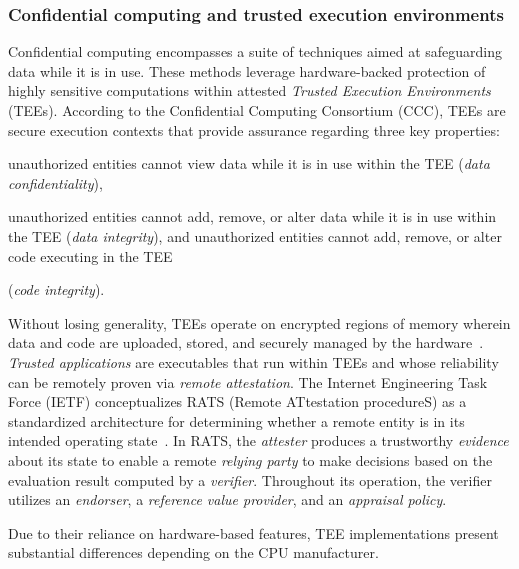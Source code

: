 \begin{newj}
\subsubsection{Confidential computing and trusted execution environments}
\label{sec:background:tee}
Confidential computing encompasses a suite of techniques aimed at safeguarding data while it is in use. These methods leverage hardware-backed protection of highly sensitive computations within attested \emph{Trusted Execution Environments} (TEEs). According to the Confidential Computing Consortium (CCC), TEEs are secure execution contexts that provide assurance regarding three key properties:
\begin{inparaenum}[]
	\item unauthorized entities cannot view data while it is in use within the TEE (\textit{data confidentiality}), \item unauthorized entities cannot add, remove, or alter data while it is in use within the TEE (\textit{data integrity}), and unauthorized entities cannot add, remove, or alter code executing in the TEE \item (\textit{code integrity}).
\end{inparaenum}
Without losing generality, TEEs operate on encrypted regions of memory wherein data and code are uploaded, stored, and securely managed by the hardware~\citep{DBLP:conf/trustcom/SabtAB15}.
\emph{Trusted applications} are executables that run within TEEs and whose reliability can be remotely proven via \emph{remote attestation}. The Internet Engineering Task Force (IETF) conceptualizes RATS (Remote ATtestation procedureS) as a standardized architecture for determining whether a remote entity is in its intended operating state~\cite{rfc9334}. In RATS, the \emph{attester} produces a trustworthy \emph{evidence} about its state to enable a remote \emph{relying party} to make decisions based on the evaluation result computed by a \emph{verifier}. Throughout its operation, the verifier utilizes an \emph{endorser}, a \emph{reference value provider}, and an \emph{appraisal policy}.

Due to their reliance on hardware-based features, TEE implementations present substantial differences depending on the CPU manufacturer.



\end{newj}
